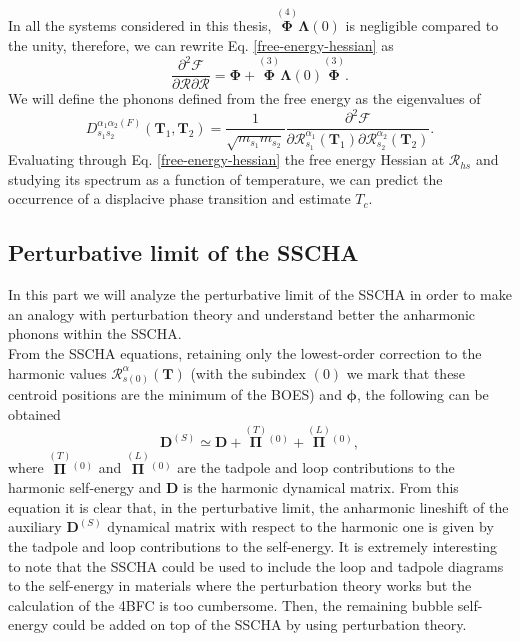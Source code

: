 In all the systems considered in this thesis, $\overset{(4)}{\boldsymbol{\Phi}}\boldsymbol{\Lambda}(0)$ is negligible compared to the unity, therefore, we can rewrite Eq. \ref{free-energy-hessian} as
\begin{equation}
 \frac{\partial^{2}\mathcal{F}}{\partial\boldsymbol{\mathcal{R}}\partial\boldsymbol{\mathcal{R}}}=\boldsymbol{\Phi}+\overset{(3)}{\boldsymbol{\Phi}}\boldsymbol{\Lambda}(0)\overset{(3)}{\boldsymbol{\Phi}}.
\end{equation}
We will define the phonons defined from the free energy as the eigenvalues of
\begin{equation}
 \label{free-energy-dynamical-matrix}
 D_{s_{1}s_{2}}^{\alpha_{1}\alpha_{2}(F)}(\mathbf{T}_{1},\mathbf{T}_{2})=\frac{1}{\sqrt{m_{s_{1}}m_{s_{2}}}}\frac{\partial^{2}\mathcal{F}}{\partial\mathcal{R}_{s_{1}}^{\alpha_{1}}(\mathbf{T}_{1})\partial\mathcal{R}_{s_{2}}^{\alpha_{
 2}}(\mathbf{T}_{2})}.
\end{equation} 
Evaluating through Eq. \ref{free-energy-hessian} the free energy Hessian at $\boldsymbol{\mathcal{R}}_{hs}$ and studying its spectrum as a function of temperature, we can predict the occurrence of a displacive phase transition 
and estimate $T_{c}$. 

\subsection{Perturbative limit of the SSCHA}
\label{pertubative-limit-sscha}

In this part we will analyze the perturbative limit of the SSCHA in order to make an analogy with perturbation theory and understand better the anharmonic phonons within the SSCHA. \\

From the SSCHA equations, retaining only the lowest-order correction to the harmonic values $\mathcal{R}_{s(0)}^{\alpha}(\mathbf{T})$ (with the subindex $(0)$ we mark that these centroid positions are the minimum of the BOES) and 
$\boldsymbol{\phi}$, the following can be obtained\cite{bianco2017second}
\begin{equation}
 \mathbf{D}^{(S)}\simeq\mathbf{D}+\overset{(T)}{\boldsymbol{\Pi}}{}^{(0)}+\overset{(L)}{\boldsymbol{\Pi}}{}^{(0)},
\end{equation}
where $\overset{(T)}{\boldsymbol{\Pi}}{}^{(0)}$ and $\overset{(L)}{\boldsymbol{\Pi}}{}^{(0)}$ are the tadpole and loop contributions to the harmonic self-energy and $\mathbf{D}$ is the harmonic dynamical matrix. From 
this equation it is clear that, in the perturbative limit, the anharmonic lineshift of the auxiliary $\mathbf{D}^{(S)}$ dynamical matrix with respect to the harmonic one is given by the tadpole and loop 
contributions to the self-energy. It is extremely interesting to note that the SSCHA could be used to include the loop and tadpole diagrams to the self-energy in materials where the perturbation theory works but 
the calculation of the 4BFC is too cumbersome. Then, the remaining bubble self-energy could be added on top of the SSCHA by using perturbation theory\cite{paulatto2015first}. \\

